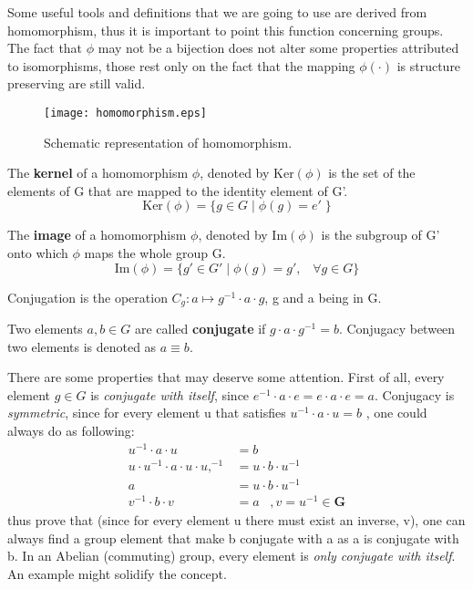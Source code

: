 Some useful tools and definitions that we are going to use are derived from homomorphism, thus it is important to point this function concerning groups. The fact that $\phi$ may not be a bijection does not alter some properties attributed to isomorphisms, those rest only on the fact that the mapping $\phi(\cdot)$ is structure preserving are still valid.

\begin{figure}[H]
\center
\texttt{[image: homomorphism.eps]}
\caption{Schematic representation of homomorphism.}
\end{figure}


\begin{definition}
\label{def:kernel}

The \textbf{kernel} of a homomorphism $\phi$, denoted by $\text{Ker}(\phi)$ is the set of the elements of G that are mapped to the identity element of G'.
\cite{rosen_symmetry_1995}
\[\text{Ker}(\phi) = \{g \in G \; | \; \phi(g) = e' \; \}\]
\end{definition}
%
\begin{definition}
\label{def:image}
The \textbf{image} of a homomorphism $\phi$, denoted by $\text{Im}(\phi)$ is the subgroup of G' onto which  $\phi$ maps the whole group G. 
\cite{rosen_symmetry_1995}
\[\text{Im}(\phi) = \{g' \in G' \; | \; \phi(g) = g', \;\;\; \forall g \in G \}\]
\end{definition}
%
\begin{definition}[Conjugation]
\label{def:conjugacy_class}
Conjugation is the operation $C_g : a \mapsto g^{-1} \cdot a\cdot g$, g and a being in G.

Two elements $a,b \in G$ are called \textbf{conjugate} if $g\cdot a \cdot g^{-1} = b$. Conjugacy between two elements is denoted as $a \equiv b$. 
\cite{rosen_symmetry_1995}
\end{definition}
%

There are some properties that may deserve some attention. First of all, every element $g \in G$ is \textit{conjugate with itself}, since $e^{-1} \cdot a \cdot e = e \cdot a \cdot e = a$. Conjugacy is \textit{symmetric}, since for every element u that satisfies $u^{-1} \cdot a \cdot u = b$ , one could always do as following:
\begin{align}
u^{-1} \cdot a \cdot u &= b  \\
u\cdot u^{-1} \cdot a \cdot u\cdot u,^{-1} &= u\cdot b \cdot u^{-1}\\
a &= u\cdot b \cdot u^{-1}\\
v^{-1}\cdot b \cdot v &= a \;\;\; , v=u^{-1} \in \mathbf{G}
\end{align}
thus prove that (since for every element u there must exist an inverse, v), one can always find a group element that make b conjugate with a as a is conjugate with b. In an Abelian (commuting) group, every element is \textit{only conjugate with itself}. An example might solidify the concept. 

